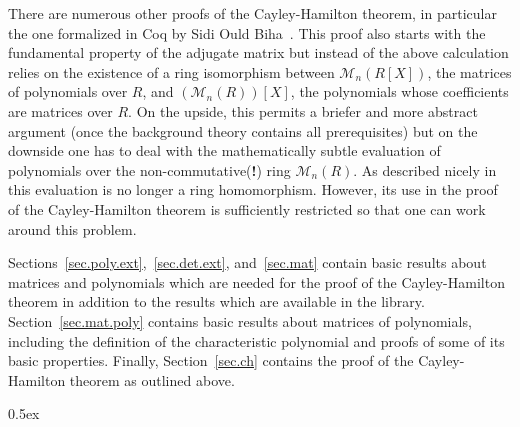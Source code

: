 \documentclass[11pt,a4paper]{article}
\begin{document}
There are numerous other proofs of the Cayley-Hamilton theorem, in particular the one formalized in Coq by Sidi Ould Biha~\cite{Biha08Formalisation,Biha10Composants}.
This proof also starts with the fundamental property of the adjugate matrix but instead of the above calculation relies
on the existence of a ring isomorphism between $\mathcal{M}_n(R[X])$, the matrices of polynomials over $R$, and $(\mathcal{M}_n(R))[X]$, the polynomials
whose coefficients are matrices over $R$. On the upside, this permits a briefer and more abstract argument (once the background theory contains all
prerequisites) but on the downside one has to deal with the mathematically subtle evaluation of polynomials over the non-commutative({\bf !}) ring $\mathcal{M}_n(R)$. As described
nicely in~\cite{Biha10Composants} this evaluation is no longer a ring homomorphism. However, its use in the proof of the Cayley-Hamilton theorem is sufficiently
restricted so that one can work around this problem.

Sections~\ref{sec.poly.ext},~\ref{sec.det.ext}, and~\ref{sec.mat} contain basic results
about matrices and polynomials which are needed for the proof of the Cayley-Hamilton theorem
in addition to the results which are available in the library. Section~\ref{sec.mat.poly} contains
basic results about matrices of polynomials, including the definition of the characteristic
polynomial and proofs of some of its basic properties. Finally, Section~\ref{sec.ch} contains
the proof of the Cayley-Hamilton theorem as outlined above.

\parindent 0pt\parskip 0.5ex





\end{document}
